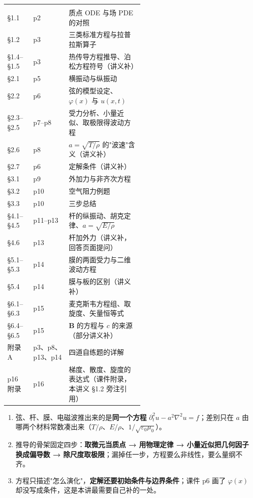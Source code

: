 \documentclass[11pt]{ctexart}
\renewcommand{\thead}[1]{\leavevmode{\bfseries\color{violetdeep}#1}}
\newcommand{\tabmidrule}{\noalign{\vspace{1pt}{\color{petal}\hrule height 0.5pt}\vspace{1pt}}}
\let\orighdr\hdr
\renewcommand{\hdr}[2]{\par\needspace{6\baselineskip}\orighdr{#1}{#2}}
\begin{document}
\begin{minipage}{\linewidth}
\small
\tabtop
\begin{tabular}{@{}l l p{0.55\linewidth}@{}}
\thead{本讲义} & \thead{课件页} & \thead{对应内容} \\
\tabmidrule
§1.1 & p2 & 质点 ODE 与场 PDE 的对照 \\
§1.2 & p3 & 三类标准方程与拉普拉斯算子 \\
§1.4--§1.5 & p3 & 热传导方程推导、泊松方程符号（讲义补） \\
§2.1 & p5 & 横振动与纵振动 \\
§2.2 & p6 & 弦的模型设定、$\varphi(x)$ 与 $u(x,t)$ \\
§2.3--§2.5 & p7--p8 & 受力分析、小量近似、取极限得波动方程 \\
§2.6 & p8 & $a=\sqrt{T/\rho}$ 的"波速"含义（讲义补） \\
§2.7 & p6 & 定解条件（讲义补） \\
§3.1 & p9 & 外加力与非齐次方程 \\
§3.2 & p10 & 空气阻力例题 \\
§3.3 & p10 & 三步总结 \\
§4.1--§4.5 & p11--p13 & 杆的纵振动、胡克定律、$a=\sqrt{E/\rho}$ \\
§4.6 & p13 & 杆加外力（讲义补，回答页面提问） \\
§5.1--§5.3 & p14 & 膜的两面受力与二维波动方程 \\
§5.4 & p14 & 膜与板的区别（讲义补） \\
§6.1--§6.3 & p15 & 麦克斯韦方程组、取旋度、矢量恒等式 \\
§6.4--§6.5 & p15 & $\mathbf B$ 的方程与 $c$ 的来源（部分讲义补） \\
附录 A & p3、p8、p13、p14 & 四道自练题的详解 \\
p16 附录 & p16 & 梯度、散度、旋度的表达式（课件附录，本讲义 §1.2 旁注引用） \\
\end{tabular}
\tabbot
\end{minipage}


\begin{enumerate}
\item 弦、杆、膜、电磁波推出来的是\textbf{同一个方程} $\partial_t^2u-a^2\nabla^2u=f$；差别只在 $a$ 由哪两个材料常数凑出来（$T/\rho$、$E/\rho$、$1/\sqrt{\varepsilon_0\mu_0}$）。
\item 推导的骨架固定四步：\textbf{取微元当质点 → 用物理定律 → 小量近似把几何因子换成偏导数 → 除尺度取极限}；漏掉任一步，方程要么非线性，要么量纲不齐。
\item 方程只描述"怎么演化"，\textbf{定解还要初始条件与边界条件}；课件 p6 画了 $\varphi(x)$ 却没写成条件，这是本讲最需要自己补的一处。
\end{enumerate}
\end{document}
